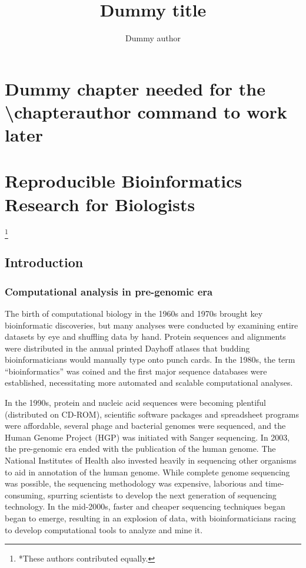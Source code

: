 \documentclass[ChapterTOCs,krantz2]{krantz} %
\begin{document}
\title{Dummy title} \author{Dummy author} \chapter*{Dummy chapter needed for
the \textbackslash chapterauthor command to work later}

\mainmatter



\chapter{Reproducible Bioinformatics Research for Biologists}
\footnote{*These authors contributed equally.}

\section{Introduction}\label{intro}

\subsection{Computational analysis in pre-genomic era}

The birth of computational biology in the 1960s
and 1970s brought key bioinformatic discoveries, but many analyses
were conducted by examining entire datasets by eye and shuffling data by hand.
Protein sequences and alignments were distributed in the annual printed Dayhoff
atlases \cite{Strasser2010} that budding bioinformaticians 
would manually type onto punch cards.  In the 1980s,
the term ``bioinformatics'' was coined and the first major sequence databases
were established, necessitating more automated and scalable computational analyses.

In the 1990s, protein and nucleic acid sequences were becoming plentiful
(distributed on CD-ROM), scientific software packages and spreadsheet programs
were affordable, several phage and bacterial genomes were sequenced, and the Human Genome Project (HGP) was initiated with Sanger
sequencing.  In 2003, the pre-genomic era ended with the publication of the human genome\cite{Lander2001,Collins2003,HGP}.  The National Institutes of Health also
invested heavily in sequencing other organisms to aid in annotation of the 
human genome.  While complete genome
sequencing was possible, the sequencing methodology was expensive, laborious and time-consuming,
spurring scientists to develop the next generation of sequencing technology.
In the mid-2000s, faster and cheaper
sequencing techniques began began to emerge, resulting in an explosion
of data, with bioinformaticians racing to develop computational tools
to analyze and mine it\cite{Ansorge2009}.
\end{document}
